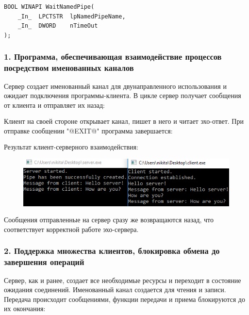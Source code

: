 \documentclass[14pt,a4paper,report]{report}
\begin{document}
\begin{verbatim}
BOOL WINAPI WaitNamedPipe(
    _In_  LPCTSTR  lpNamedPipeName,
    _In_  DWORD    nTimeOut
);
\end{verbatim}

\subsubsection{1. Программа, обеспечивающая взаимодействие процессов посредством именованных каналов}

Сервер создает именованный канал для двунаправленного использования и ожидает подключения программы-клиента. В цикле сервер получает сообщения от клиента и отправляет их назад:



\clearpage

Клиент на своей стороне открывает канал, пишет в него и читает эхо-ответ. При отправке сообщении "@EXIT@" программа завершается:



\clearpage

Результат клиент-серверного взаимодействия:

\begin{figure}[h!]
	\centering
	\includegraphics[scale = 1.05]{images/p2_1.png}
	
	\caption{}
	\label{image:4}
\end{figure}

Сообщения отправленные на сервер сразу же возвращаются назад, что соответствует корректной работе эхо-сервера.

\subsubsection{2. Поддержка множества клиентов, блокировка обмена до завершения операций}

Сервер, как и ранее, создает все необходимые ресурсы и переходит в состояние ожидания соединений. Именованный канал создается для чтения и записи. Передача происходит сообщениями, функции передачи и приема блокируются до их окончания:
\end{document}
